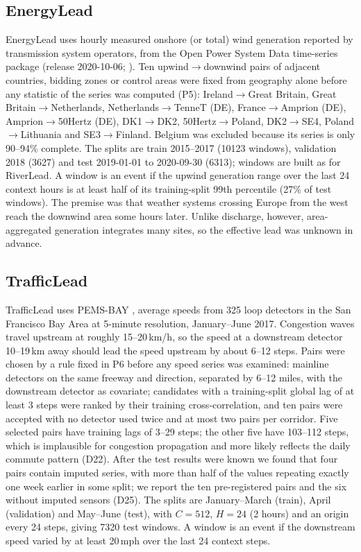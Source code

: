\documentclass[preprint,11pt,authoryear]{elsarticle}
\begin{document}
\subsection{EnergyLead}
EnergyLead uses hourly measured onshore (or total) wind generation reported by transmission system operators, from the Open Power System Data time-series package (release 2020-10-06; \citealp{opsd2020}). Ten upwind$\to$downwind pairs of adjacent countries, bidding zones or control areas were fixed from geography alone before any statistic of the series was computed (P5): Ireland$\to$Great Britain, Great Britain$\to$Netherlands, Netherlands$\to$TenneT (DE), France$\to$Amprion (DE), Amprion$\to$50Hertz (DE), DK1$\to$DK2, 50Hertz$\to$Poland, DK2$\to$SE4, Poland$\to$Lithuania and SE3$\to$Finland. Belgium was excluded because its series is only 90--94\% complete. The splits are train 2015--2017 (\num{10123} windows), validation 2018 (\num{3627}) and test 2019-01-01 to 2020-09-30 (\num{6313}); windows are built as for RiverLead. A window is an event if the upwind generation range over the last 24 context hours is at least half of its training-split 99th percentile (27\% of test windows). The premise was that weather systems crossing Europe from the west reach the downwind area some hours later. Unlike discharge, however, area-aggregated generation integrates many sites, so the effective lead was unknown in advance.

\subsection{TrafficLead}
TrafficLead uses PEMS-BAY \citep{li2018dcrnn}, average speeds from 325 loop detectors in the San Francisco Bay Area at 5-minute resolution, January--June 2017. Congestion waves travel upstream at roughly 15--20\,km/h, so the speed at a downstream detector 10--19\,km away should lead the speed upstream by about 6--12 steps. Pairs were chosen by a rule fixed in P6 before any speed series was examined: mainline detectors on the same freeway and direction, separated by 6--12 miles, with the downstream detector as covariate; candidates with a training-split global lag of at least 3 steps were ranked by their training cross-correlation, and ten pairs were accepted with no detector used twice and at most two pairs per corridor. Five selected pairs have training lags of 3--29 steps; the other five have 103--112 steps, which is implausible for congestion propagation and more likely reflects the daily commute pattern (D22). After the test results were known we found that four pairs contain imputed series, with more than half of the values repeating exactly one week earlier in some split; we report the ten pre-registered pairs and the six without imputed sensors (D25). The splits are January--March (train), April (validation) and May--June (test), with $C=512$, $H=24$ (2 hours) and an origin every 24 steps, giving \num{7320} test windows. A window is an event if the downstream speed varied by at least 20\,mph over the last 24 context steps.
\end{document}
